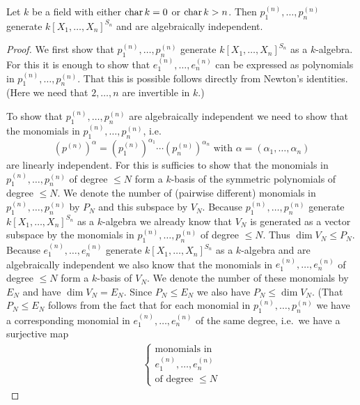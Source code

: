 \begin{thrm}
  Let $k$ be a field with either $\operatorname{char} k = 0$ or $\operatorname{char} k > n$.
  Then $p^{(n)}_1, \dotsc, p^{(n)}_n$ generate $k[X_1, \dotsc, X_n]^{S_n}$ and are algebraically independent.
\end{thrm}
\begin{proof}
  We first show that $p^{(n)}_1, \dotsc, p^{(n)}_n$ generate $k[X_1, \dotsc, X_n]^{S_n}$ as a $k$-algebra.
  For this it is enough to show that $e^{(n)}_1, \dotsc, e^{(n)}_n$ can be expressed as polynomials in $p^{(n)}_1, \dotsc, p^{(n)}_n$.
  That this is possible follows directly from Newton’s identities.
  (Here we need that $2, \dotsc, n$ are invertible in $k$.)
  
  To show that $p^{(n)}_1, \dotsc, p^{(n)}_n$ are algebraically independent we need to show that the monomials in $p^{(n)}_1, \dotsc, p^{(n)}_n$, i.e.\
  \[
      \left(p^{(n)}\right)^\alpha
    = \left(p^{(n)}_1\right)^{\alpha_1} \dotsm \left(p^{(n)}_n\right)^{\alpha_n}
    \text{ with }
      \alpha
    = (\alpha_1, \dotsc, \alpha_n)
  \]
  are linearly independent.
  For this is sufficies to show that the monomials in $p^{(n)}_1, \dotsc, p^{(n)}_n$ of degree $\leq N$ form a $k$-basis of the symmetric polynomials of degree $\leq N$.
  We denote the number of (pairwise different) monomials in $p^{(n)}_1, \dotsc, p^{(n)}_n$ by $P_N$ and this subspace by $V_N$.
  Because $p^{(n)}_1, \dotsc, p^{(n)}_n$ generate $k[X_1, \dotsc, X_n]^{S_n}$ as a $k$-algebra we already know that $V_N$ is generated as a vector subspace by the monomials in $p^{(n)}_1, \dotsc, p^{(n)}_n$ of degree $\leq N$.
  Thus $\dim V_N \leq P_N$.
  Because $e^{(n)}_1, \dotsc, e^{(n)}_n$ generate $k[X_1, \dotsc, X_n]^{S_n}$ as a $k$-algebra and are algebraically independent we also know that the monomials in $e^{(n)}_1, \dotsc, e^{(n)}_n$ of degree $\leq N$ form a $k$-basis of $V_N$.
  We denote the number of these monomials by $E_N$ and have $\dim V_N = E_N$.
  Since $P_N \leq E_N$ we also have $P_N \leq \dim V_N$. (That $P_N \leq E_N$ follows from the fact that for each monomial in $p^{(n)}_1, \dotsc, p^{(n)}_n$ we have a corresponding monomial in $e^{(n)}_1, \dotsc, e^{(n)}_n$ of the same degree, i.e.\ we have a surjective map
\begin{align*}
  \left\{
    \begin{array}{c}
      \text{monomials in} \\
      e^{(n)}_1, \dotsc, e^{(n)}_n \\
      \text{of degree $\leq N$}
    \end{array}

\end{align*}
\end{proof}
